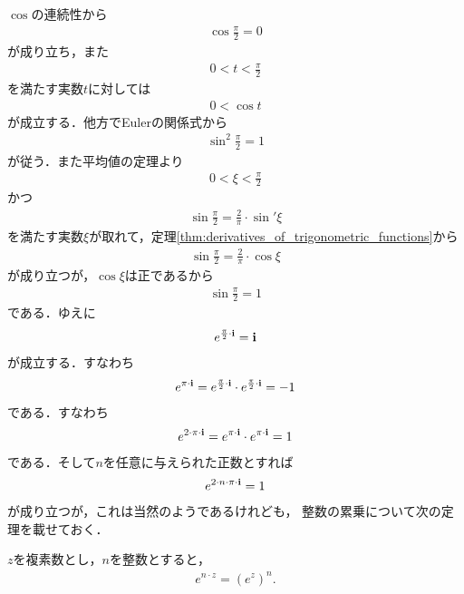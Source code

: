 	$\cos$の連続性から
	\begin{align}
		\cos{\frac{\pi}{2}} = 0
	\end{align}
	が成り立ち，また
	\begin{align}
		0 < t < \frac{\pi}{2}
	\end{align}
	を満たす実数$t$に対しては
	\begin{align}
		0 < \cos{t}
	\end{align}
	が成立する．他方でEulerの関係式から
	\begin{align}
		\sin^2{\frac{\pi}{2}} = 1
	\end{align}
	が従う．また平均値の定理より
	\begin{align}
		0 < \xi < \frac{\pi}{2}
	\end{align}
	かつ
	\begin{align}
		\sin{\frac{\pi}{2}}
		= \frac{2}{\pi} \cdot \sin'{\xi}
	\end{align}
	を満たす実数$\xi$が取れて，定理\ref{thm:derivatives_of_trigonometric_functions}から
	\begin{align}
		\sin{\frac{\pi}{2}}
		= \frac{2}{\pi} \cdot \cos{\xi}
	\end{align}
	が成り立つが，$\cos{\xi}$は正であるから
	\begin{align}
		\sin{\frac{\pi}{2}} = 1
	\end{align}
	である．ゆえに
	\begin{align}
		e^{\frac{\pi}{2} \cdot \mathbf{i}} = \mathbf{i}
	\end{align}
	が成立する．すなわち
	\begin{align}
		e^{\pi \cdot \mathbf{i}}
		= e^{\frac{\pi}{2} \cdot \mathbf{i}} \cdot e^{\frac{\pi}{2} \cdot \mathbf{i}}
		= -1
	\end{align}
	である．すなわち
	\begin{align}
		e^{2 \cdot \pi \cdot \mathbf{i}}
		= e^{\pi \cdot \mathbf{i}} \cdot e^{\pi \cdot \mathbf{i}}
		= 1
	\end{align}
	である．そして$n$を任意に与えられた正数とすれば
	\begin{align}
		e^{2 \cdot n \cdot \pi \cdot \mathbf{i}} = 1
	\end{align}
	が成り立つが，これは当然のようであるけれども，
	整数の累乗について次の定理を載せておく．
	
	\begin{screen}
		\begin{thm}[指数関数の整数乗]
		\label{thm:integer_exponentiation_of_exponential_function}
			$z$を複素数とし，$n$を整数とすると，
			\begin{align}
				e^{n \cdot z} = (e^z)^n.
			\end{align}
		\end{thm}
	\end{screen}
	
